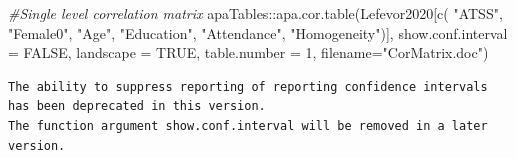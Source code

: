 \documentclass[
  english,
]{book}
\newenvironment{Shaded}{\begin{snugshade}}{\end{snugshade}}
\newcommand{\AttributeTok}[1]{\textcolor[rgb]{0.77,0.63,0.00}{#1}}
\newcommand{\CommentTok}[1]{\textcolor[rgb]{0.56,0.35,0.01}{\textit{#1}}}
\newcommand{\ConstantTok}[1]{\textcolor[rgb]{0.00,0.00,0.00}{#1}}
\newcommand{\DecValTok}[1]{\textcolor[rgb]{0.00,0.00,0.81}{#1}}
\newcommand{\FunctionTok}[1]{\textcolor[rgb]{0.00,0.00,0.00}{#1}}
\newcommand{\NormalTok}[1]{#1}
\newcommand{\SpecialCharTok}[1]{\textcolor[rgb]{0.00,0.00,0.00}{#1}}
\newcommand{\StringTok}[1]{\textcolor[rgb]{0.31,0.60,0.02}{#1}}
\begin{document}
\begin{Shaded}
\begin{Highlighting}[]
\CommentTok{\#Single level correlation matrix}
\NormalTok{apaTables}\SpecialCharTok{::}\FunctionTok{apa.cor.table}\NormalTok{(Lefevor2020[}\FunctionTok{c}\NormalTok{(}
\StringTok{"ATSS"}\NormalTok{, }\StringTok{"Female0"}\NormalTok{, }\StringTok{"Age"}\NormalTok{, }\StringTok{"Education"}\NormalTok{, }\StringTok{"Attendance"}\NormalTok{, }\StringTok{"Homogeneity"}\NormalTok{)], }\AttributeTok{show.conf.interval =} \ConstantTok{FALSE}\NormalTok{, }\AttributeTok{landscape =} \ConstantTok{TRUE}\NormalTok{, }\AttributeTok{table.number =} \DecValTok{1}\NormalTok{, }\AttributeTok{filename=}\StringTok{"CorMatrix.doc"}\NormalTok{)}
\end{Highlighting}
\end{Shaded}

\begin{verbatim}
The ability to suppress reporting of reporting confidence intervals has been deprecated in this version.
The function argument show.conf.interval will be removed in a later version.
\end{verbatim}
\end{document}
